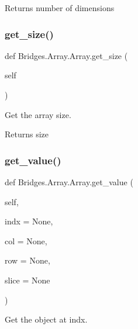 \begin{DoxyReturn}{Returns}
number of dimensions 
\end{DoxyReturn}
\mbox{\label{class_bridges_1_1_array_1_1_array_a6b3843b3cd57ab072c7db1ca6c107d1d}} 
\subsubsection{\texorpdfstring{get\+\_\+size()}{get\_size()}}
{\footnotesize\ttfamily def Bridges.\+Array.\+Array.\+get\+\_\+size (\begin{DoxyParamCaption}\item[{}]{self }\end{DoxyParamCaption})}



Get the array size. 

\begin{DoxyReturn}{Returns}
size 
\end{DoxyReturn}
\mbox{\label{class_bridges_1_1_array_1_1_array_a45379fc5c5b5c039ac75b01cd40195dd}} 
\subsubsection{\texorpdfstring{get\+\_\+value()}{get\_value()}}
{\footnotesize\ttfamily def Bridges.\+Array.\+Array.\+get\+\_\+value (\begin{DoxyParamCaption}\item[{}]{self,  }\item[{}]{indx = {\ttfamily None},  }\item[{}]{col = {\ttfamily None},  }\item[{}]{row = {\ttfamily None},  }\item[{}]{slice = {\ttfamily None} }\end{DoxyParamCaption})}



Get the object at \textquotesingle{}indx\textquotesingle{}. 


